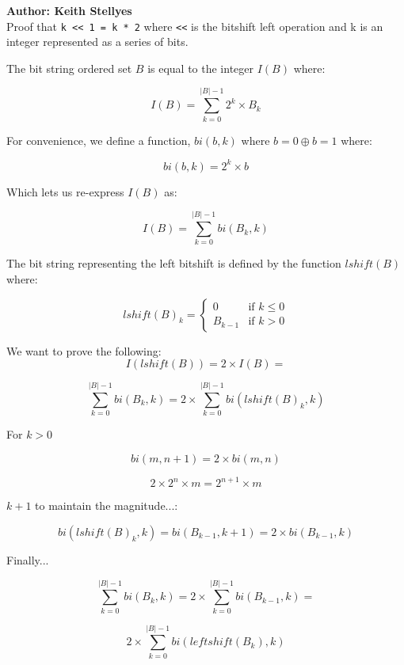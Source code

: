 \documentclass{article}
\begin{document}
	
\textbf{Author: Keith Stellyes}\\

Proof that \texttt{k << 1 = k * 2} where \texttt{<<} is the bitshift left operation and k is an integer represented as a series of bits.\

The bit string ordered set $B$ is equal to the integer $I(B)$ where:

$$I(B) = \sum_{k=0}^{|B| - 1} 2^{k} \times B_{k}$$

For convenience, we define a function, $bi(b, k)$ where $b = 0 \oplus b = 1$ where:

$$bi(b, k) = 2^{k} \times b$$

Which lets us re-express $I(B)$ as:

$$I(B) = \sum_{k=0}^{|B| - 1} bi(B_{k}, k)$$

The bit string representing the left bitshift is defined by the function $lshift(B)$ where:

$$lshift(B)_{k} = \begin{cases}
0 & \mbox{if } k \leq 0\\
B_{k - 1} & \mbox{if } k > 0
\end{cases}
$$

We want to prove the following: $$I(lshift(B)) = 2 \times I(B) = $$ 

$$\sum_{k=0}^{|B| - 1} bi(B_{k}, k) = 2 \times \sum_{k=0}^{|B| - 1} bi(lshift(B)_{k}, k)$$

For $k > 0$

$$bi(m, n + 1) = 2 \times bi(m, n)$$

$$2 \times 2^{n} \times m = 2^{n + 1} \times m$$

$k+1$ to maintain the magnitude...:

$$bi(lshift(B)_{k}, k) = bi({B_{k - 1}, k + 1}) = 2 \times bi(B_{k - 1}, k)$$

Finally...

$$\sum_{k=0}^{|B| - 1} bi(B_{k}, k) = 2 \times \sum_{k=0}^{|B| - 1} bi(B_{k - 1}, k) = $$

$$2 \times \sum_{k=0}^{|B| - 1} bi(leftshift(B_{k}), k)$$
\end{document}
